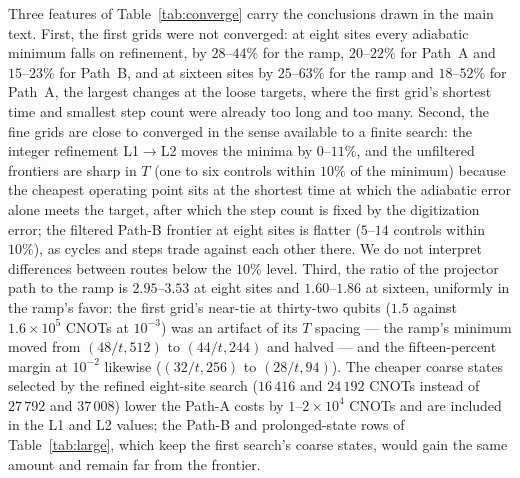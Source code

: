 \documentclass[a4paper,11pt,noarxiv]{quantumarticle}
\begin{document}
Three features of Table~\ref{tab:converge} carry the conclusions drawn
in the main text.  First, the first grids were not converged: at eight
sites every adiabatic minimum falls on refinement, by $28$--$44\%$ for the
ramp, $20$--$22\%$ for Path~A and $15$--$23\%$ for Path~B, and at sixteen
sites by $25$--$63\%$ for the ramp and $18$--$52\%$ for Path~A, the largest
changes at the loose targets, where the first grid's shortest time and
smallest step count were already too long and too many.  Second, the fine
grids are close to converged in the sense available to a finite search:
the integer refinement L1$\to$L2 moves the minima by $0$--$11\%$, and the
unfiltered frontiers are sharp in $T$ (one to six controls within $10\%$
of the minimum) because the cheapest operating point sits at the shortest
time at which the adiabatic error alone meets the target, after which the
step count is fixed by the digitization error; the filtered Path-B
frontier at eight sites is flatter ($5$--$14$ controls within $10\%$), as
cycles and steps trade against each other there.  We do not interpret
differences between routes below the $10\%$ level.  Third, the ratio of
the projector path to the ramp is $2.95$--$3.53$ at eight sites and
$1.60$--$1.86$ at sixteen, uniformly in the ramp's favor: the first grid's
near-tie at thirty-two qubits ($1.5$ against $1.6\times10^5$ CNOTs at
$10^{-3}$) was an artifact of its $T$ spacing --- the ramp's minimum
moved from $(48/t,512)$ to $(44/t,244)$ and halved --- and the
fifteen-percent margin at $10^{-2}$ likewise ($(32/t,256)$ to $(28/t,94)$).
The cheaper coarse states selected by the refined eight-site search
($16\,416$ and $24\,192$ CNOTs instead of $27\,792$ and $37\,008$) lower the
Path-A costs by $1$--$2\times10^4$ CNOTs and are included in the L1 and L2
values; the Path-B and prolonged-state rows of Table~\ref{tab:large},
which keep the first search's coarse states, would gain the same amount
and remain far from the frontier.
\end{document}
